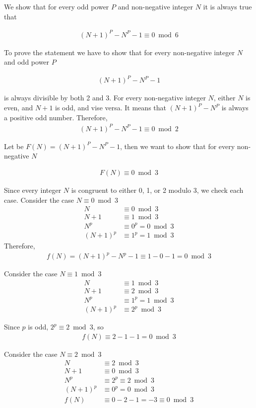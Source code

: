 We show that for every odd power $P$ and non-negative integer $N$ it is always true that

\begin{align*}
(N+1)
    ^P - N^P - 1 \equiv 0 \bmod{6}
\end{align*}

To prove the statement we have to show that for every non-negative integer $N$ and odd power $P$

\begin{align*}
    (N+1)^P - N^P - 1
\end{align*}

is always divisible by both 2 and 3.
For every non-negative integer $N$, either $N$ is even, and $N+1$ is odd, and vise versa.
It means that $(N+1)^P - N^P$ is always a positive odd number.
Therefore,
\begin{align*}
    (N+1)^P - N^P - 1 \equiv 0 \bmod{2}
\end{align*}

Let be $F(N) = (N+1)^P - N^P - 1$, then we want to show that for every non-negative $N$

\begin{align*}
    F(N) \equiv 0 \bmod{3}
\end{align*}

Since every integer $N$ is congruent to either 0, 1, or 2 modulo 3, we check each case.
Consider the case $N \equiv 0 \bmod 3$
\begin{align*}
    N &\equiv 0 \bmod 3 \\
    N+1 &\equiv 1 \bmod 3 \\
    N^p &\equiv 0^p = 0 \bmod 3 \\
    (N+1)^p &\equiv 1^p = 1 \bmod 3
\end{align*}
Therefore,
\begin{align*}
    f(N) = (N+1)^p - N^p - 1 \equiv 1 - 0 - 1 = 0 \bmod 3
\end{align*}

Consider the case $N \equiv 1 \bmod 3$
\begin{align*}
    N &\equiv 1 \bmod 3 \\
    N+1 &\equiv 2 \bmod 3 \\
    N^p &\equiv 1^p = 1 \bmod 3 \\
    (N+1)^p &\equiv 2^p \bmod 3
\end{align*}

Since $p$ is odd, $2^p \equiv 2 \bmod 3$, so
\begin{align*}
    f(N) \equiv 2 - 1 - 1 = 0 \bmod 3
\end{align*}

Consider the case  $N \equiv 2 \bmod 3$
\begin{align*}
    N &\equiv 2 \bmod 3 \\
    N+1 &\equiv 0 \bmod 3 \\
    N^p &\equiv 2^p \equiv 2 \bmod 3 \\
    (N+1)^p &\equiv 0^p = 0 \bmod 3 \\
    f(N) &\equiv 0 - 2 - 1 = -3 \equiv 0 \bmod 3
\end{align*}
